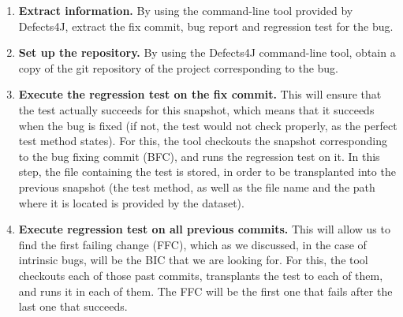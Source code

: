 \begin{enumerate}
  \item \textbf{Extract information.} 
    By using the command-line tool provided by Defects4J, extract the fix commit, bug report and regression test for the bug.
  \item \textbf{Set up the repository.} 
    By using the Defects4J command-line tool, obtain a copy of the git repository of the project corresponding to the bug.
  \item \textbf{Execute the regression test on the fix commit.} 
    This will ensure that the test actually succeeds for this snapshot, which means that it succeeds when the bug is fixed (if not, the test would not check properly, as the perfect test method states). For this, the tool checkouts the snapshot corresponding to the bug fixing commit (BFC), and runs the regression test on it.
    In this step, the file containing the test is stored, in order to be transplanted into the previous snapshot (the test method, as well as the file name and the path where it is located is provided by the dataset).
  \item \textbf{Execute regression test on all previous commits.}
    This will allow us to find the first failing change (FFC), which as we discussed, in the case of intrinsic bugs, will be the BIC that we are looking for. For this, the tool checkouts each of those past commits, transplants the test to each of them, and runs it in each of them. 
    The FFC will be the first one that fails after the last one that succeeds. 
\end{enumerate}

